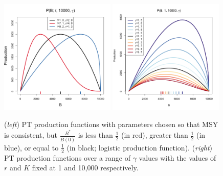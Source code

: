 \documentclass[12pt]{article}
\begin{document}
{%
\begin{figure}[h!]
	\centering
	\includegraphics[width=0.49\textwidth]{./plots/srr1.1.png}	
	\includegraphics[width=0.49\textwidth]{./plots/srr2.png}
	\caption{\label{srrPT}
	(\emph{left}) PT production functions with parameters chosen so that MSY is consistent, but $\frac{B^*}{\bar B(0)}$ is less than $\frac{1}{2}$ (in red), greater than $\frac{1}{2}$ (in blue), or equal to $\frac{1}{2}$ (in black; logistic production function).
	(\emph{right}) PT production functions over a range of $\gamma$ values with the values of $r$ and $K$ fixed at 1 and 10,000 respectively.  
	}
\end{figure}

}
\end{document}
